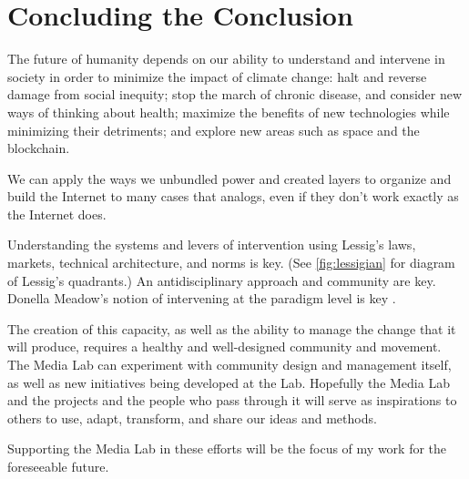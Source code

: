 \section{Concluding the Conclusion}

The future of humanity depends on our ability to understand and intervene in society in order to minimize the impact of climate change: halt and reverse damage from social inequity; stop the march of chronic disease, and consider new ways of thinking about health; maximize the benefits of new technologies while minimizing their detriments; and explore new areas such as space and the blockchain.

We can apply the ways we unbundled power and created layers to organize and build the Internet to many cases that analogs, even if they don't work exactly as the Internet does. 

Understanding the systems and levers of intervention using Lessig's laws, markets, technical architecture, and norms is key. (See \autoref{fig:lessigian} for diagram of Lessig's quadrants.) An antidisciplinary approach and community are key. Donella Meadow's notion of intervening at the paradigm level is key \cite{meadows_leverage}.

The creation of this capacity, as well as the ability to manage the change that it will produce, requires a healthy and well-designed community and movement. The Media Lab can experiment with community design and management itself, as well as new initiatives being developed at the Lab. Hopefully the Media Lab and the projects and the people who pass through it will serve as inspirations to others to use, adapt, transform, and share our ideas and methods.

Supporting the Media Lab in these efforts will be the focus of my work for the foreseeable future.
